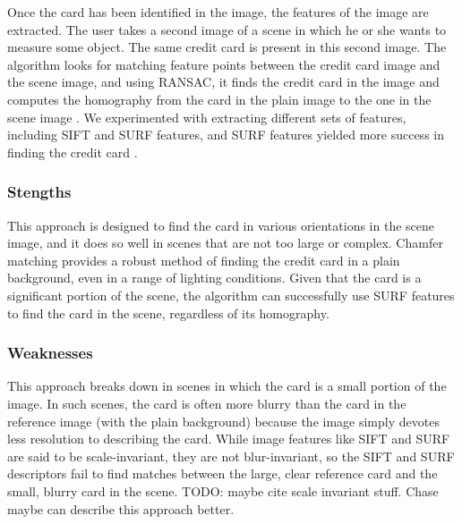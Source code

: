 \documentclass[10pt,twocolumn,letterpaper]{article}
\begin{document}
Once the card has been identified in the image, the features of the image are extracted. The user takes a second image of a scene in which he or she wants to measure some object. The same credit card is present in this second image. The algorithm looks for matching feature points between the credit card image and the scene image, and using RANSAC, it finds the credit card in the image and computes the homography from the card in the plain image to the one in the scene image \cite{ransac}. We experimented with extracting different sets of features, including SIFT and SURF features, and SURF features yielded more success in finding the credit card \cite{sift} \cite{surf}. 

\subsubsection{Stengths}
	This approach is designed to find the card in various orientations in the scene image, and it does so well in scenes that are not too large or complex. Chamfer matching provides a robust method of finding the credit card in a plain background, even in a range of lighting conditions. Given that the card is a significant portion of the scene, the algorithm can successfully use SURF features to find the card in the scene, regardless of its homography. 
	
\subsubsection{Weaknesses}
	This approach breaks down in scenes in which the card is a small portion of the image. In such scenes, the card is often more blurry than the card in the reference image (with the plain background) because the image simply devotes less resolution to describing the card. While image features like SIFT and SURF are said to be scale-invariant, they are not blur-invariant, so the SIFT and SURF descriptors fail to find matches between the large, clear reference card and the small, blurry card in the scene. TODO: maybe cite scale invariant stuff. Chase maybe can describe this approach better. 
	
\end{document}
